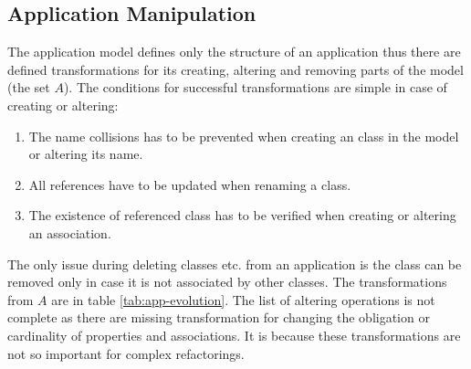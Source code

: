 \documentclass[runningheads]{comsis}
\begin{document}
\subsection{Application Manipulation}
\label{sec:app-evolution}
The application model defines only the structure of an application thus there are defined transformations for its creating, altering and removing parts of the model (the set $A$). The conditions for successful transformations are simple in case of creating or altering:
\begin{enumerate}
	\item The name collisions has to be prevented when creating an class in the model or altering its name.
	\item All references have to be updated when renaming a class.
	\item The existence of referenced class has to be verified when creating or altering an association.  
\end{enumerate}
The only issue during deleting classes etc. from an application is the class can be removed only in case it is not associated by other classes. The transformations from $A$ are in table \ref{tab:app-evolution}. The list of altering operations is not complete as there are missing transformation for changing the obligation or cardinality of properties and associations. It is because these transformations are not so important for complex refactorings. 
\end{document}
